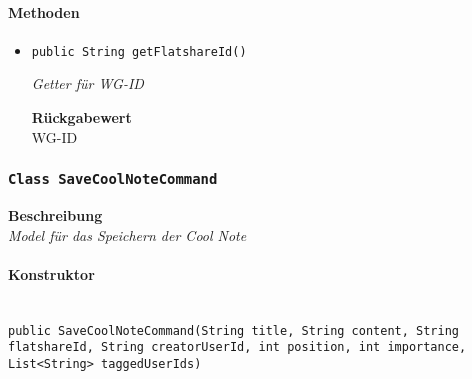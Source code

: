     \paragraph*{Methoden}
    \begin{itemize}
    	\item{\texttt{public String getFlatshareId()}}
    	
    	\textit{Getter für WG-ID}
    	
    	
    	
    	\textbf{Rückgabewert} \\
    	WG-ID
    \end{itemize}
    \subsubsection{\texttt{Class SaveCoolNoteCommand}}
    \textbf{Beschreibung} \\
    \textit{Model für das Speichern der Cool Note}
    \paragraph*{Konstruktor}\mbox{} \\
    \texttt{public SaveCoolNoteCommand(String title, String content, String flatshareId, String creatorUserId, int position, int importance, List<String> taggedUserIds)} \\
